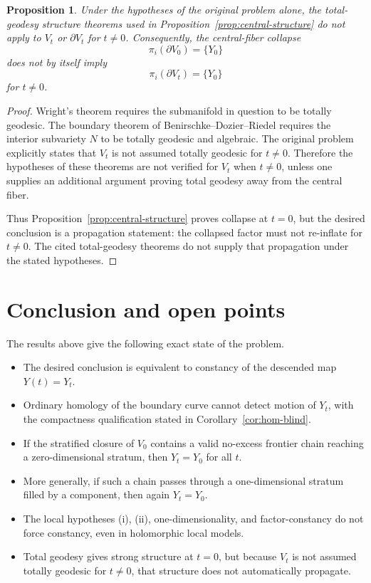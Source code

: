 \documentclass[12pt]{article}
\theoremstyle{plain}
\newtheorem{proposition}[theorem]{Proposition}
\theoremstyle{definition}
\theoremstyle{remark}
\begin{document}
\begin{proposition}\label{prop:propagation-gap}
Under the hypotheses of the original problem alone, the total-geodesy structure theorems used in Proposition~\ref{prop:central-structure} do not apply to \(V_t\) or \(\partial V_t\) for \(t\neq 0\).  Consequently, the central-fiber collapse
\[
\pi_i(\partial V_0)=\{Y_0\}
\]
does not by itself imply
\[
\pi_i(\partial V_t)=\{Y_0\}
\]
for \(t\neq 0\).
\end{proposition}

\begin{proof}
Wright's theorem requires the submanifold in question to be totally geodesic.  The boundary theorem of Benirschke--Dozier--Riedel requires the interior subvariety \(N\) to be totally geodesic and algebraic.  The original problem explicitly states that \(V_t\) is not assumed totally geodesic for \(t\neq 0\).  Therefore the hypotheses of these theorems are not verified for \(V_t\) when \(t\neq 0\), unless one supplies an additional argument proving total geodesy away from the central fiber.

Thus Proposition~\ref{prop:central-structure} proves collapse at \(t=0\), but the desired conclusion is a propagation statement: the collapsed factor must not re-inflate for \(t\neq 0\).  The cited total-geodesy theorems do not supply that propagation under the stated hypotheses.
\end{proof}

\section{Conclusion and open points}

The results above give the following exact state of the problem.

\begin{itemize}
  \item The desired conclusion is equivalent to constancy of the descended map \(Y(t)=Y_t\).
  \item Ordinary homology of the boundary curve cannot detect motion of \(Y_t\), with the compactness qualification stated in Corollary~\ref{cor:hom-blind}.
  \item If the stratified closure of \(V_0\) contains a valid no-excess frontier chain reaching a zero-dimensional stratum, then \(Y_t=Y_0\) for all \(t\).
  \item More generally, if such a chain passes through a one-dimensional stratum filled by a component, then again \(Y_t=Y_0\).
  \item The local hypotheses (i), (ii), one-dimensionality, and factor-constancy do not force constancy, even in holomorphic local models.
  \item Total geodesy gives strong structure at \(t=0\), but because \(V_t\) is not assumed totally geodesic for \(t\neq 0\), that structure does not automatically propagate.
\end{itemize}
\end{document}
